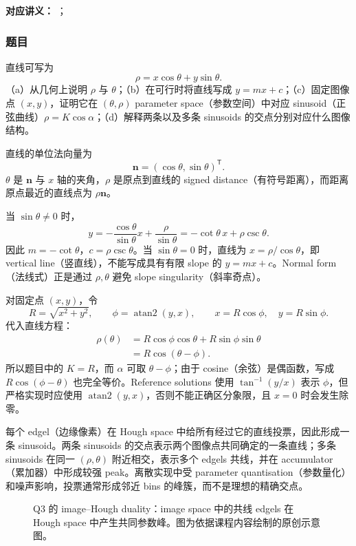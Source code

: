 
\textbf{对应讲义：}
；

\subsubsection*{题目}

直线可写为
\[
  \rho=x\cos\theta+y\sin\theta.
\]
（a）从几何上说明 $\rho$ 与 $\theta$；（b）在可行时将直线写成 $y=mx+c$；（c）固定图像点 $(x,y)$，证明它在 $(\theta,\rho)$ parameter space（参数空间）中对应 sinusoid（正弦曲线）$\rho=K\cos\alpha$；（d）解释两条以及多条 sinusoids 的交点分别对应什么图像结构。

\begin{checkedsolution}
直线的单位法向量为
\[
  \mathbf n=(\cos\theta,\sin\theta)^{\mathsf T}.
\]
$\theta$ 是 $\mathbf n$ 与 $x$ 轴的夹角，$\rho$ 是原点到直线的 signed distance（有符号距离），而距离原点最近的直线点为 $\rho\mathbf n$。

当 $\sin\theta\ne0$ 时，
\[
  y=-\frac{\cos\theta}{\sin\theta}x
  +\frac{\rho}{\sin\theta}
  =-\cot\theta\,x+\rho\csc\theta.
\]
因此 $m=-\cot\theta$，$c=\rho\csc\theta$。当 $\sin\theta=0$ 时，直线为 $x=\rho/\cos\theta$，即 vertical line（竖直线），不能写成具有有限 slope 的 $y=mx+c$。Normal form（法线式）正是通过 $\rho,\theta$ 避免 slope singularity（斜率奇点）。

对固定点 $(x,y)$，令
\[
  R=\sqrt{x^2+y^2},\qquad
  \phi=\operatorname{atan2}(y,x),\qquad
  x=R\cos\phi,\quad y=R\sin\phi.
\]
代入直线方程：
\begin{align*}
  \rho(\theta)
  &=R\cos\phi\cos\theta+R\sin\phi\sin\theta\\
  &=\boxed{R\cos(\theta-\phi)}.
\end{align*}
所以题目中的 $K=R$，而 $\alpha$ 可取 $\theta-\phi$；由于 cosine（余弦）是偶函数，写成 $R\cos(\phi-\theta)$ 也完全等价。Reference solutions 使用 $\tan^{-1}(y/x)$ 表示 $\phi$，但严格实现时应使用 $\operatorname{atan2}(y,x)$，否则不能正确区分象限，且 $x=0$ 时会发生除零。

每个 edgel（边缘像素）在 Hough space 中给所有经过它的直线投票，因此形成一条 sinusoid。两条 sinusoids 的交点表示两个图像点共同确定的一条直线；多条 sinusoids 在同一 $(\rho,\theta)$ 附近相交，表示多个 edgels 共线，并在 accumulator（累加器）中形成较强 peak。离散实现中受 parameter quantisation（参数量化）和噪声影响，投票通常形成邻近 bins 的峰簇，而不是理想的精确交点。

\begin{figure}[htbp]
  \centering
  \resizebox{0.94\textwidth}{!}{}
  \caption{Q3 的 image--Hough duality：image space 中的共线 edgels 在 Hough space 中产生共同参数峰。图为依据课程内容绘制的原创示意图。}
  \label{fig:sc4061-tut04-hough-voting}
\end{figure}
\end{checkedsolution}

